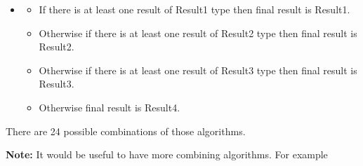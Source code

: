 \documentclass[a4paper]{article}
\newcommand\liststyleWWviiiNumxxi{%
\renewcommand\labelitemi{[F0B7?]}
\renewcommand\labelitemii{o}
\renewcommand\labelitemiii{[F0A7?]}
\renewcommand\labelitemiv{[F0B7?]}
}
\begin{document}
\liststyleWWviiiNumxxi
\begin{itemize}
\item \begin{itemize}
\item {\color{black}
If there is at least one result of Result1 type then final result is
Result1.}
\item {\color{black}
Otherwise if there is at least one result of Result2 type then final
result is Result2.}
\item {\color{black}
Otherwise if there is at least one result of Result3 type then final
result is Result3.}
\item {\color{black}
Otherwise final result is Result4.}
\end{itemize}
\end{itemize}
{\color{black}
There are 24 possible combinations of those algorithms.}

{\upshape\color{black}
\foreignlanguage{english}{\textbf{Note:}}\foreignlanguage{english}{ It
would be useful to have more combining algorithms. For example }}
\end{document}
